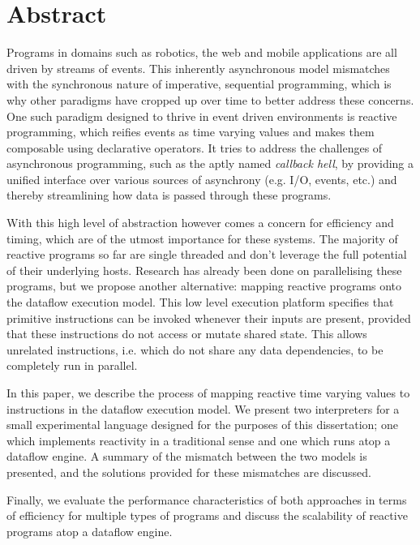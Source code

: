 \section*{Abstract}

Programs in domains such as robotics, the web and mobile applications are all driven by streams of events. This inherently asynchronous model mismatches with the synchronous nature of imperative, sequential programming, which is why other paradigms have cropped up over time to better address these concerns. One such paradigm designed to thrive in event driven environments is reactive programming, which reifies events as time varying values and makes them composable using declarative operators. It tries to address the challenges of asynchronous programming, such as the aptly named \textit{callback hell}, by providing a unified interface over various sources of asynchrony (e.g. I/O, events, etc.) and thereby streamlining how data is passed through these programs.

With this high level of abstraction however comes a concern for efficiency and timing, which are of the utmost importance for these systems. The majority of reactive programs so far are single threaded and don't leverage the full potential of their underlying hosts.  Research has already been done on parallelising these programs, but we propose another alternative: mapping reactive programs onto the dataflow execution model. This low level execution platform specifies that primitive instructions can be invoked whenever their inputs are present, provided that these instructions do not access or mutate shared state. This allows unrelated instructions, i.e. which do not share any data dependencies, to be completely run in parallel.

In this paper, we describe the process of mapping reactive time varying values to instructions in the dataflow execution model. We present two interpreters for a small experimental language designed for the purposes of this dissertation; one which implements reactivity in a traditional sense and one which runs atop a dataflow engine. 
A summary of the mismatch between the two models is presented, and the solutions provided for these mismatches are discussed. 

Finally, we evaluate the performance characteristics of both approaches in terms of efficiency for multiple types of programs and discuss the scalability of reactive programs atop a dataflow engine.
            